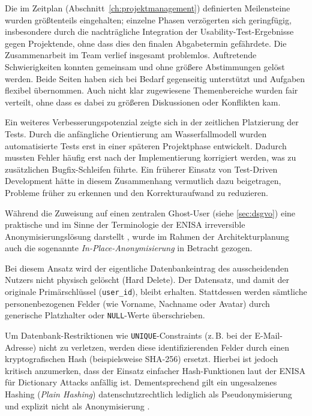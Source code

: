 \label{ch:reflexion}

Die im Zeitplan (Abschnitt~\ref{ch:projektmanagement}) definierten Meilensteine wurden größtenteils eingehalten; einzelne Phasen verzögerten sich geringfügig, insbesondere durch die nachträgliche Integration der Usability-Test-Ergebnisse gegen Projektende, ohne dass dies den finalen Abgabetermin gefährdete.
Die Zusammenarbeit im Team verlief insgesamt problemlos. Auftretende Schwierigkeiten konnten gemeinsam und ohne größere Abstimmungen gelöst werden. Beide Seiten haben sich bei Bedarf gegenseitig unterstützt und Aufgaben flexibel übernommen. Auch nicht klar zugewiesene Themenbereiche wurden fair verteilt, ohne dass es dabei zu größeren Diskussionen oder Konflikten kam.

Ein weiteres Verbesserungspotenzial zeigte sich in der zeitlichen Platzierung der Tests. Durch die anfängliche Orientierung am Wasserfallmodell wurden automatisierte Tests erst in einer späteren Projektphase entwickelt. Dadurch mussten Fehler häufig erst nach der Implementierung korrigiert werden, was zu zusätzlichen Bugfix-Schleifen führte. Ein früherer Einsatz von Test-Driven Development hätte in diesem Zusammenhang vermutlich dazu beigetragen, Probleme früher zu erkennen und den Korrekturaufwand zu reduzieren.

\label{sec:live_chat_alternativen}
Während die Zuweisung auf einen zentralen Ghost-User (siehe \autoref{sec:dsgvo}) eine praktische und im Sinne der Terminologie der \gls{ENISA} irreversible Anonymisierungslösung darstellt \cite[S.~9--10]{enisa2019pseudonymisation}, wurde im Rahmen der Architekturplanung auch die sogenannte \textit{In-Place-Anonymisierung} in Betracht gezogen.

Bei diesem Ansatz wird der eigentliche Datenbankeintrag des ausscheidenden Nutzers nicht physisch gelöscht (Hard Delete). Der Datensatz, und damit der originale Primärschlüssel (\texttt{user\_id}), bleibt erhalten. Stattdessen werden sämtliche personenbezogenen Felder (wie Vorname, Nachname oder Avatar) durch generische Platzhalter oder \texttt{NULL}-Werte überschrieben.

Um Datenbank-Restriktionen wie \texttt{UNIQUE}-Constraints (z.\,B. bei der E-Mail-Adresse) nicht zu verletzen, werden diese identifizierenden Felder durch einen kryptografischen Hash (beispielsweise SHA-256) ersetzt. Hierbei ist jedoch kritisch anzumerken, dass der Einsatz einfacher Hash-Funktionen laut der \gls{ENISA} für Dictionary Attacks anfällig ist. Dementsprechend gilt ein ungesalzenes Hashing (\textit{Plain Hashing}) datenschutzrechtlich lediglich als Pseudonymisierung und explizit nicht als Anonymisierung \cite[S.~22, 33]{enisa2019pseudonymisation}.

